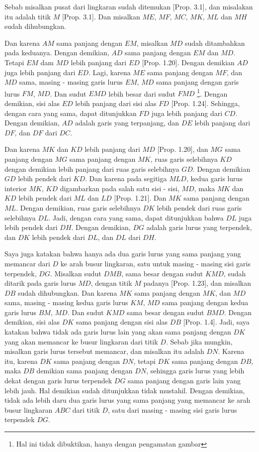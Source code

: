 \documentclass[a4paper]{book}
\begin{document}
Sebab misalkan pusat dari lingkaran sudah ditemukan [Prop. 3.1], dan misalakan
itu adalah titik $M$ [Prop. 3.1]. Dan misalkan $ME$, $MF$, $MC$, $MK$, $ML$
dan $MH$ sudah dihubungkan.

Dan karena $AM$ sama panjang dengan $EM$, misalkan $MD$ sudah ditambahkan
pada keduanya. Dengan demikian, $AD$ sama panjang dengan $EM$ dan $MD$. Tetapi
$EM$ dam $MD$ lebih panjang dari $ED$ [Prop. 1.20]. Dengan demikian $AD$ juga
lebih panjang dari $ED$. Lagi, karena $ME$ sama panjang dengan $MF$, dan $MD$
sama, masing - masing garis lurus $EM$, $MD$ sama panjang dengan
garis lurus $FM$, $MD$. Dan sudut $EMD$ lebih besar dari sudut $FMD$ 
\footnote{Hal ini tidak dibuktikan, hanya dengan pengamatan gambar}. Dengan
demikian, sisi alas $ED$ lebih panjang dari sisi alas $FD$ [Prop. 1.24]. 
Sehingga, dengan cara yang sama, dapat ditunjukkan $FD$ juga lebih panjang 
dari $CD$. Dengan demikian, $AD$ adalah garis yang terpanjang, dan $DE$
lebih panjang dari $DF$, dan $DF$ dari $DC$.

Dan karena $MK$ dan $KD$ lebih panjang dari $MD$ [Prop. 1.20], dan $MG$ sama
panjang dengan $MG$ sama panjang dengan $MK$, ruas garis selebihnya $KD$ 
dengan demikian lebih panjang dari ruas garis selebihnya $GD$. Dengan demikian
$GD$ lebih pendek dari $KD$. Dan karena pada segitiga $MLD$, kedua garis lurus
interior $MK$, $KD$ digambarkan pada salah satu sisi - sisi, $MD$, maka $MK$
dan $KD$ lebih pendek dari $ML$ dan $LD$ [Prop. 1.21]. Dan $MK$ sama panjang
dengan $ML$. Dengan demikian, ruas garis selebihnya $DK$ lebih pendek dari
ruas garis selebihnya $DL$. Jadi, dengan cara yang sama, dapat ditunjukkan
bahwa $DL$ juga lebih pendek dari $DH$. Dengan demikian, $DG$ adalah garis
lurus yang terpendek, dan $DK$ lebih pendek dari $DL$, dan $DL$ dari $DH$.

Saya juga katakan bahwa hanya ada dua garis lurus yang sama panjang yang 
memancar dari $D$ ke arah busur lingkaran, satu untuk masing - masing sisi
garis terpendek, $DG$. Misalkan sudut $DMB$, sama besar dengan sudut $KMD$,
sudah ditarik pada garis lurus $MD$, dengan titik $M$ padanya [Prop. 1.23],
dan misalkan $DB$ sudah dihubungkan. Dan karena $MK$ sama panjang dengan $MK$,
dan $MD$ sama, masing - masing kedua garis lurus $KM$, $MD$ sama panjang 
dengan kedua garis lurus $BM$, $MD$. Dan sudut $KMD$ sama besar dengan sudut
$BMD$. Dengan demikian, sisi alas $DK$ sama panjang dengan sisi alas $DB$ 
[Prop. 1.4]. Jadi, saya katakan bahwa tidak ada garis lurus lain yang akan sama
panjang dengan $DK$ yang akan memancar ke busur lingkaran dari titik $D$. 
Sebab jika mungkin, misalkan garis lurus tersebut memancar, dan misalkan itu
adalah $DN$. Karena itu, karena $DK$ sama panjang dengan $DN$, tetapi $DK$
sama panjang dengan $DB$, maka $DB$ demikian sama panjang dengan $DN$, 
sehingga garis lurus yang lebih dekat dengan garis lurus terpendek $DG$ sama
panjang dengan garis lain yang lebih jauh. Hal demikian sudah ditunjukkan 
tidak mustahil. Dengan demikian, tidak ada lebih daru dua garis lurus yang 
sama panjang yang memancar ke arah busur lingkaran $ABC$ dari titik $D$, satu
dari masing - masing sisi garis lurus terpendek $DG$.
\end{document}
